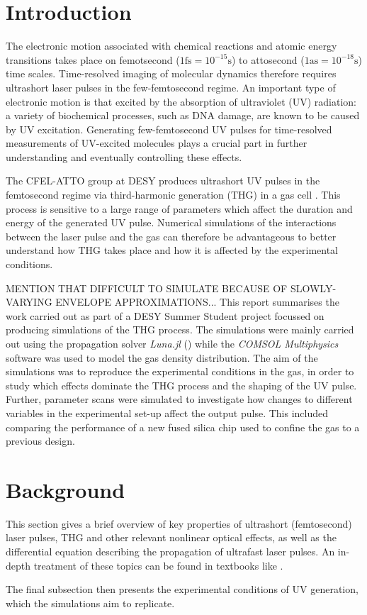 \documentclass[a4paper]{jpconf}
\begin{document}
\section{Introduction}
The electronic motion associated with chemical reactions and atomic energy transitions takes place on femotsecond ($1 \text{fs} = 10^{-15} \text{s}$) to attosecond ($1 \text{as} = 10^{-18} \text{s}$) time scales. Time-resolved imaging of molecular dynamics therefore requires ultrashort laser pulses in the few-femtosecond regime. An important type of electronic motion is that excited by the absorption of ultraviolet (UV) radiation: a variety of biochemical processes, such as DNA damage, are known to be caused by UV excitation. Generating few-femtosecond UV pulses for time-resolved measurements of UV-excited molecules plays a crucial part in further understanding and eventually controlling these effects. \par 
The CFEL-ATTO group at DESY produces ultrashort UV pulses in the femtosecond regime via third-harmonic generation (THG) in a gas cell \cite{galli2019}. This process is sensitive to a large range of parameters which affect the duration and energy of the generated UV pulse. Numerical simulations of the interactions between the laser pulse and the gas can therefore be advantageous to better understand how THG takes place and how it is affected by the experimental conditions. \par 
MENTION THAT DIFFICULT TO SIMULATE BECAUSE OF SLOWLY-VARYING ENVELOPE APPROXIMATIONS...
This report summarises the work carried out as part of a DESY Summer Student project focussed on producing simulations of the THG process. The simulations were mainly carried out using the propagation solver \textit{Luna.jl} (\cite{brahms2023}) while the \textit{COMSOL Multiphysics} software was used to model the gas density distribution. The aim of the simulations was to reproduce the experimental conditions in the gas, in order to study which effects dominate the THG process and the shaping of the UV pulse. Further, parameter scans were simulated to investigate how changes to different variables in the experimental set-up affect the output pulse. This included comparing the performance of a new fused silica chip used to confine the gas to a previous design. 

\section{Background}
This section gives a brief overview of key properties of ultrashort (femtosecond) laser pulses,  THG and other relevant nonlinear optical effects, as well as the differential equation describing the propagation of ultrafast laser pulses. An in-depth treatment of these topics can be found in textbooks like \cite{keller2021, new2011}. \par 
The final subsection then presents the experimental conditions of UV generation, which the simulations aim to replicate. 
\end{document}
